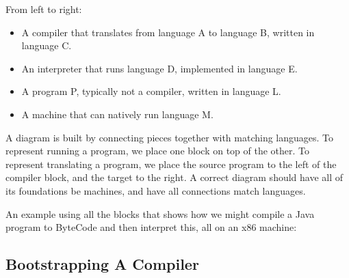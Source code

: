 \documentclass[12pt,a4paper,twoside,openright]{report}
\newcommand{\tblocktext}[3]{
    {#1} \& $\to$   \& {#2} \\
    {}     \&  {#3}   \&      \\
}
\newcommand{\tblockoutline}[1]{
    \draw (#1-1-1.south west) |- (#1-1-3.north east) |- (#1-1-3.south west) |- (#1-2-2.south west) |- (#1-1-1.south west);
}
\newcommand{\wblocktext}[1]{
    {#1} \\
    {}\\
}
\newcommand{\wblockoutline}[1]{
    \draw (#1-1-1.south west) |- (#1-1-1.north east) -- (#1-1-1.south east) -- (#1-2-1.south) -- (#1-1-1.south west);
}
\newcommand{\vblocktext}[2]{
    	{#1} 	\\
      			\\
	{#2}	\\
}
\newcommand{\vblockoutline}[1]{
	\draw (#1-1-1.north west) |- (#1-3-1.south east) |-  (#1-1-1.north west);
}
\newcommand{\pblocktext}[2]{
    	{#1} 	\\
	{#2}	\\
}
\newcommand{\pblockoutline}[1]{
	\draw (#1-1-1.north west) arc [radius=0.55, start angle=90, end angle = 270];
	\draw (#1-1-1.south east) arc [radius=0.55, start angle=270, end angle = 450];
	\draw (#1-1-1.north west) -- (#1-1-1.north east);
	\draw (#1-1-1.south east) |- (#1-2-1.south west)  |-  (#1-2-1.north west);
}
\newcommand{\wsupt}[2]{
	\node(mac#2) at (#2-2-2.south west) [wblock, anchor = mac#2-1-1.north west] {\wblocktext{#1}};
	\wblockoutline{mac#2};
}
\begin{document}
From left to right:

 \begin{itemize}
 	\item A compiler that translates from language A to language B, written in language C.
 	\item An interpreter that runs language D, implemented in language E.
 	\item A program P, typically not a compiler, written in language L.
 	\item A machine that can natively run language M.
\end{itemize}

A diagram is built by connecting pieces together with matching languages. To represent running a program, we place one block on top of the other. To represent translating a program, we place the source program to the left of the compiler block, and the target to the right. A correct diagram should have all of its foundations be machines, and have all connections match languages.

 \bigskip
 
An example using all the blocks that shows how we might compile a Java program to ByteCode and then interpret this, all on an x86 machine:

\begin{center}
\end{center}

\subsection{Bootstrapping A Compiler}
	
\end{document}

